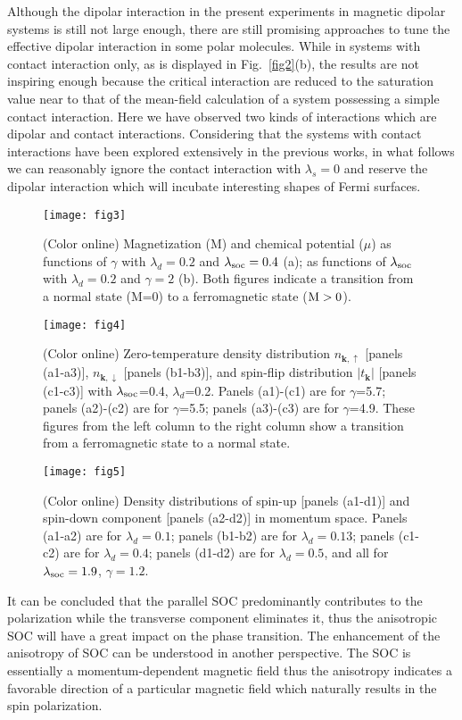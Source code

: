 \documentclass[twocolumn,english,pra,superscriptaddress]{revtex4-1}
\begin{document}
 Although the dipolar interaction in the present experiments in magnetic dipolar systems \cite{PhysRevLett.108.215301,PhysRevX.6.031022} is still not large enough, there are still promising approaches \cite{li2021tuning} to tune the effective dipolar interaction in some polar molecules. While in systems with contact interaction only, as is displayed in Fig.~\ref{fig2}(b), the results are not inspiring enough because the critical interaction are reduced to the saturation value near to that of the mean-field calculation of a system possessing a simple contact interaction. Here we have observed two kinds of interactions which are dipolar and contact interactions. Considering that the systems with contact interactions have been explored extensively in the previous works, in what follows we can reasonably ignore the contact interaction with $\lambda_{s}=0$ and reserve the dipolar interaction which will incubate interesting shapes of Fermi surfaces.\par
\begin{figure}
	\texttt{[image: fig3]}%
	\caption{(Color online) Magnetization (M) and chemical potential ($\mu$) as functions of $\gamma$ with $\lambda_{d}=0.2$ and $\lambda_{\rm soc}=0.4$ (a); as functions of $\lambda_{\rm soc}$ with $\lambda_{d}=0.2$ and $\gamma=2$ (b). Both figures indicate a transition from a normal state (M=0) to a ferromagnetic state ($\rm M>0$). }\label{fig3}
\end{figure}
\begin{figure}[t]
	\texttt{[image: fig4]}%
	\caption{(Color online) Zero-temperature density distribution $n_{\mathbf{k},\uparrow}$ [panels (a1-a3)], $n_{\mathbf{k},\downarrow}$ [panels (b1-b3)], and spin-flip distribution $|t_{\mathbf{k}}|$ [panels (c1-c3)] with $\lambda_{\rm soc}$=0.4, $\lambda_{d}$=0.2. Panels (a1)-(c1) are for $\gamma$=5.7; panels (a2)-(c2) are for $\gamma$=5.5; panels (a3)-(c3) are for $\gamma$=4.9. These figures from the left column to the right column show a transition from a ferromagnetic state to a normal state.}\label{fig4}
\end{figure}
\begin{figure*}
	\texttt{[image: fig5]}%
	\caption{(Color online) Density distributions of spin-up [panels (a1-d1)] and spin-down component [panels (a2-d2)] in momentum space. Panels (a1-a2) are for $\lambda_{d}=0.1$; panels (b1-b2) are for $\lambda_{d}=0.13$; panels (c1-c2) are for $\lambda_{d}=0.4$; panels (d1-d2) are for $\lambda_{d}=0.5$, and all for $\lambda_{\rm soc}=1.9$, $\gamma=1.2$.}\label{fig5}
\end{figure*}
It can be concluded that the parallel SOC predominantly contributes to the polarization while the transverse component eliminates it, thus the anisotropic SOC will have a great impact on the phase transition. The enhancement of the anisotropy of SOC can be understood in another perspective. The SOC is essentially a momentum-dependent magnetic field thus the anisotropy indicates a favorable direction of a particular magnetic field which naturally results in the spin polarization. \par
\end{document}
